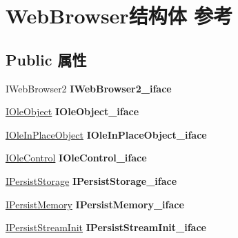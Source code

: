 \hypertarget{struct_web_browser}{}\section{Web\+Browser结构体 参考}
\label{struct_web_browser}
\subsection*{Public 属性}
\begin{DoxyCompactItemize}
\item 
\mbox{\label{struct_web_browser_a26f5d0e07272aa9d8f0053b5141ed9d3}} 
I\+Web\+Browser2 {\bfseries I\+Web\+Browser2\+\_\+iface}
\item 
\mbox{\label{struct_web_browser_a102b82c0b8f548ef6ae9fad9d91e1bcd}} 
\hyperlink{interface_i_ole_object}{I\+Ole\+Object} {\bfseries I\+Ole\+Object\+\_\+iface}
\item 
\mbox{\label{struct_web_browser_add5d9670010b4b9cf35afc9a41bc2582}} 
\hyperlink{interface_i_ole_in_place_object}{I\+Ole\+In\+Place\+Object} {\bfseries I\+Ole\+In\+Place\+Object\+\_\+iface}
\item 
\mbox{\label{struct_web_browser_abf46e3191a814c7abe62e78ccd1ca4b9}} 
\hyperlink{interface_i_ole_control}{I\+Ole\+Control} {\bfseries I\+Ole\+Control\+\_\+iface}
\item 
\mbox{\label{struct_web_browser_a99578ad45769b3a97f935281a4273a56}} 
\hyperlink{interface_i_persist_storage}{I\+Persist\+Storage} {\bfseries I\+Persist\+Storage\+\_\+iface}
\item 
\mbox{\label{struct_web_browser_abf4ef0a8266314580a7ef8c78a76e33e}} 
\hyperlink{interface_i_persist_memory}{I\+Persist\+Memory} {\bfseries I\+Persist\+Memory\+\_\+iface}
\item 
\mbox{\label{struct_web_browser_a5afbfebfc862613027ac91c29d778587}} 
\hyperlink{interface_i_persist_stream_init}{I\+Persist\+Stream\+Init} {\bfseries I\+Persist\+Stream\+Init\+\_\+iface}
\item 
\mbox{\label{struct_web_browser_ab575229eeb77da40cab547a9320398fa}} 

\end{DoxyCompactItemize}
